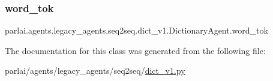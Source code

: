 \subsubsection{\texorpdfstring{word\+\_\+tok}{word\_tok}}
{\footnotesize\ttfamily parlai.\+agents.\+legacy\+\_\+agents.\+seq2seq.\+dict\+\_\+v1.\+Dictionary\+Agent.\+word\+\_\+tok}



The documentation for this class was generated from the following file\+:\begin{DoxyCompactItemize}
\item 
parlai/agents/legacy\+\_\+agents/seq2seq/\hyperlink{dict__v1_8py}{dict\+\_\+v1.\+py}\end{DoxyCompactItemize}
